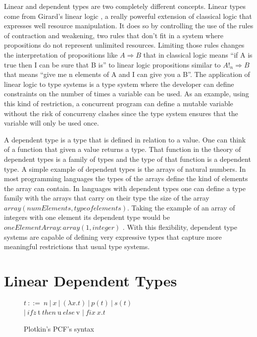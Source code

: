\documentclass[a4paper,12pt]{article}
\begin{document}
Linear and dependent types are two completely different
concepts. Linear types come from Girard's linear logic
\cite{girard1987linear}, a really powerful extension of classical logic
that expresses well resource manipulation. It does so by controlling
the use of the rules of contraction and weakening, two rules that
don't fit in a system where propositions do not represent unlimited
resources. Limiting those rules changes the interpretation of
propositions like $A \Rightarrow B$ that in classical logic means
``if A is true then I can be sure that B is'' to linear logic
propositions similar to $A!_n \Rightarrow B$ that means ``give me n
elements of A and I can give you a B''. The application of linear logic to type
systems is a type system where the developer can define constraints on the
number of times a variable can be used. As an example, using this kind of
restriction, a concurrent program can define a mutable variable without
the risk of concurreny clashes since the type system ensures that the variable
will only be used once.

A dependent type is a type that is defined in relation to a value. One can think
of a function that given a value returns a type. That function in the theory of
dependent types is a family of types and the type of that function is a
dependent type. A simple example of dependent types is the arrays of natural
numbers. In most programming languages the types of the arrays define the kind
of elements the array can contain. In languages with dependent types one can
define a type family with the arrays that carry on their type the size of the
array $array(numElements, typeofelements)$. Taking the example of an array of
integers with one element its dependent type would be $oneElementArray:array(1,
integer)$ . With this flexibility, dependent type systems are capable of defining
very expressive types that capture more meaningful restrictions that usual type
systems.


\section{Linear Dependent Types}

\begin{figure}
  \begin{center}
    $t~::=~n~|~x~|~(\lambda x.t)~|~p(t)~|~s(t)$ \\
    $|~ifz~$t$~then~$u$~else~$v $|~fix~x.t$
  \end{center}
  \caption{Plotkin's PCF's syntax}
  \label{pcf-syntax}
\end{figure}
\end{document}
